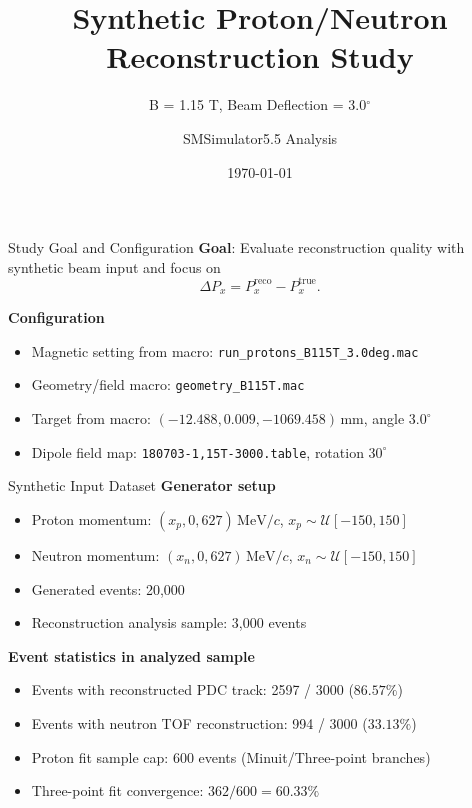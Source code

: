 \documentclass[aspectratio=169]{beamer}
\title[Synthetic p/n Reconstruction]{Synthetic Proton/Neutron Reconstruction Study}
\subtitle{B = 1.15 T, Beam Deflection = 3.0$^\circ$}
\author{SMSimulator5.5 Analysis}
\date{\today}
\begin{document}
\begin{frame}
\titlepage
\end{frame}

\begin{frame}{Study Goal and Configuration}
\textbf{Goal}: Evaluate reconstruction quality with synthetic beam input and focus on
\[
\Delta P_x = P_x^{\mathrm{reco}} - P_x^{\mathrm{true}} .
\]

\vspace{0.3cm}
\textbf{Configuration}
\begin{itemize}
\item Magnetic setting from macro: \texttt{run\_protons\_B115T\_3.0deg.mac}
\item Geometry/field macro: \texttt{geometry\_B115T.mac}
\item Target from macro: \((-12.488, 0.009, -1069.458)\,\mathrm{mm}\), angle \(3.0^\circ\)
\item Dipole field map: \texttt{180703-1,15T-3000.table}, rotation \(30^\circ\)
\end{itemize}
\end{frame}

\begin{frame}{Synthetic Input Dataset}
\textbf{Generator setup}
\begin{itemize}
\item Proton momentum: \((x_p, 0, 627)\,\mathrm{MeV}/c\), \(x_p \sim \mathcal{U}[-150,150]\)
\item Neutron momentum: \((x_n, 0, 627)\,\mathrm{MeV}/c\), \(x_n \sim \mathcal{U}[-150,150]\)
\item Generated events: 20,000
\item Reconstruction analysis sample: 3,000 events
\end{itemize}

\vspace{0.2cm}
\textbf{Event statistics in analyzed sample}
\begin{itemize}
\item Events with reconstructed PDC track: 2597 / 3000 (\(86.57\%\))
\item Events with neutron TOF reconstruction: 994 / 3000 (\(33.13\%\))
\item Proton fit sample cap: 600 events (Minuit/Three-point branches)
\item Three-point fit convergence: \(362/600 = 60.33\%\)
\end{itemize}
\end{frame}
\end{document}
